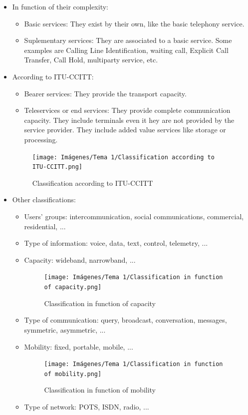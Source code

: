 \documentclass[
	12pt,
	twoside
]{book}
\begin{document}
\begin{itemize}
	\item {
		In function of their complexity:
		\begin{itemize}
			\item Basic services: They exist by their own, like the basic telephony service.
			\item Suplementary services: They are associated to a basic service. Some examples are Calling Line Identification, waiting call, Explicit Call Transfer, Call Hold, multiparty service, etc.
		\end{itemize}
	}
	\item {
		According to ITU-CCITT:
		\begin{itemize}
			\item Bearer services: They provide the transport capacity.
			\item Teleservices or end services: They provide complete communication capacity. They include terminals even it hey are not provided by the service provider. They include added value services like storage or processing.
		\end{itemize}
		\begin{figure}[H]
			\centering
			\texttt{[image: Imágenes/Tema 1/Classification according to ITU-CCITT.png]}
			\caption{
				\label{fig:unit1_according}
				Classification according to ITU-CCITT
			}
		\end{figure}
	}
	\item {
		Other classifications:

		\begin{itemize}
			\item Users' groups: intercommunication, social communications, commercial, residential, ...
			\item Type of information: voice, data, text, control, telemetry, ...
			\item {
				Capacity: wideband, narrowband, ...

				\begin{figure}[H]
					\centering
					\texttt{[image: Imágenes/Tema 1/Classification in function of capacity.png]}
					\caption{
						\label{fig:unit1_capacity}
						Classification in function of capacity
					}
				\end{figure}
			}
			\item Type of communication: query, broadcast, conversation, messages, symmetric, asymmetric, ...
			\item {
				Mobility: fixed, portable, mobile, ...

				\begin{figure}[H]
					\centering
					\texttt{[image: Imágenes/Tema 1/Classification in function of mobility.png]}
					\caption{
						\label{fig:unit1_mobility}
						Classification in function of mobility
					}
				\end{figure}
			}
			\item Type of network: POTS, ISDN, radio, ...
		\end{itemize}
	}
\end{itemize}
\end{document}
